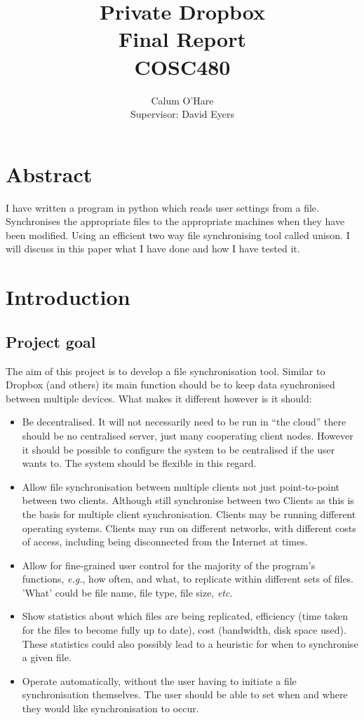\documentclass[12pt]{article}
\title{ Private Dropbox \\ Final Report \\ COSC480}
\author{Calum O'Hare \\ Supervisor: David Eyers}
\date{}
\begin{document}
\maketitle

\newpage
\section{Abstract}
I have written a program in python which reads user
settings from a file. Synchronises the appropriate files
to the appropriate machines when they have been modified.
Using an efficient two way file synchronising tool called
unison. I will discuss in this paper what I have done and
how I have tested it.
\newpage

\tableofcontents
\newpage

\section{Introduction}
\subsection{Project goal}
The aim of this project is to develop a file synchronisation tool.
Similar to  Dropbox (and others) its main function should be to
keep data synchronised between multiple devices.
What makes it different however is it should:
\begin{itemize}
\item Be decentralised. It will not necessarily need to be run in ``the cloud'' there should be
no centralised server, just many cooperating client nodes. However it should be
possible to configure the system to be centralised if the user wants to. The
system should be flexible in this regard.

\item Allow file synchronisation between multiple clients not just point-to-point
between two clients. Although still synchronise between two Clients as this is the
basis for multiple client synchronisation. Clients may be
running different operating systems. Clients may run on different networks, with different costs of access, including being disconnected from the Internet at times.

\item Allow for fine-grained user control for the majority of the program's
functions, \emph{e.g.}, how often, and what, to replicate within different sets of files. 'What' could be file name, file type, file size, \emph{etc}.

\item Show statistics about which files are being replicated, efficiency (time
taken for the files to become fully up to date),
cost (bandwidth, disk space used). These statistics could also possibly lead
to a heuristic for when to synchronise a given file.

\item Operate automatically, without the user having to initiate a file
synchronisation themselves. The user should be able to set when and
where they would like synchronisation to occur.
\end{itemize}
\end{document}
